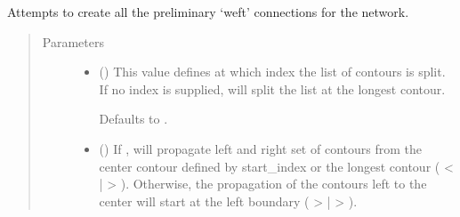 \documentclass[letterpaper,10pt,english]{sphinxmanual}
\begin{document}
\begin{fulllineitems}
\begin{fulllineitems}
\end{fulllineitems}


\begin{fulllineitems}
\label{\detokenize{cockatoo:cockatoo.KnitNetwork.initialize_weft_edges}}
Attempts to create all the preliminary ‘weft’ connections for the
network.
\begin{quote}\begin{description}
\item[{Parameters}] \leavevmode\begin{itemize}
\item {} 
 (\sphinxstyleliteralemphasis{\sphinxupquote{, }}) \textendash{} 
This value defines at which index the list of contours is split.
If no index is supplied, will split the list at the longest contour.

Defaults to .


\item {} 
 (\sphinxstyleliteralemphasis{\sphinxupquote{, }}) \textendash{} 
If , will propagate left and right set of contours from
the center contour defined by start\_index or the longest contour
( \textless{} | \textgreater{} ). Otherwise, the propagation of the contours left to the
center will start at the left boundary ( \textgreater{} | \textgreater{} ).


\end{itemize}
\end{description}
\end{quote}
\end{fulllineitems}
\end{fulllineitems}
\end{document}
